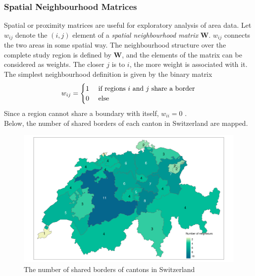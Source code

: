 \subsubsection{Spatial Neighbourhood Matrices}
Spatial or proximity matrices are useful for exploratory analysis of area data. Let $w_{ij}$ denote the $\left(i,j\right)$ element of a \textit{spatial neighbourhood matrix} $\pmb{W}$. $w_{ij}$ connects the two areas in some spatial way. The neighbourhood structure over the complete study region is defined by $\pmb{W}$, and the elements of the matrix can be considered as weights. The closer $j$ is to $i$, the more weight is associated with it. The simplest neighbourhood definition is given by the binary matrix
\begin{equation}
    w_{ij}=\begin{cases}
    1 & \hbox{ if regions } i $\hbox{ and }$ j \hbox{ share a border} \\
    0 & \hbox{ else }
    \end{cases}
\end{equation}
Since a region cannot share a boundary with itself, $w_{ii}=0$  \autocite[][]{moraga2019geospatial}.\\
Below, the number of shared borders of each canton in Switzerland are mapped.
\begin{figure}[H]
   \centering
       \includegraphics[page=1,width=\textwidth]{neighbours.pdf}
 \caption{The number of shared borders of cantons in Switzerland}
 \label{fig:neighbour}
\end{figure}
